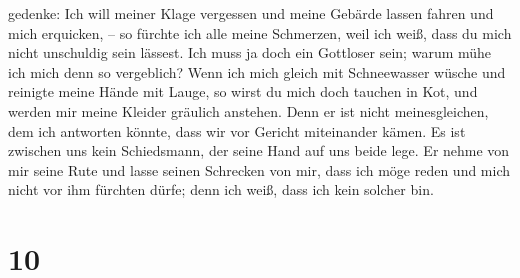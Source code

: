 gedenke: Ich will meiner Klage vergessen und meine Gebärde lassen fahren
und mich erquicken, --  so fürchte ich alle meine
Schmerzen, weil ich weiß, dass du mich nicht unschuldig sein lässest.
 Ich muss ja doch ein Gottloser sein; warum mühe ich mich
denn so vergeblich?  Wenn ich mich gleich mit
Schneewasser wüsche und reinigte meine Hände mit Lauge, 
so wirst du mich doch tauchen in Kot, und werden mir meine Kleider
gräulich anstehen.  Denn er ist nicht meinesgleichen, dem
ich antworten könnte, dass wir vor Gericht miteinander kämen.
 Es ist zwischen uns kein Schiedsmann, der seine Hand auf
uns beide lege.  Er nehme von mir seine Rute und lasse
seinen Schrecken von mir,  dass ich möge reden und mich
nicht vor ihm fürchten dürfe; denn ich weiß, dass ich kein solcher bin.

\hypertarget{section-9}{%
\section{10}\label{section-9}}

